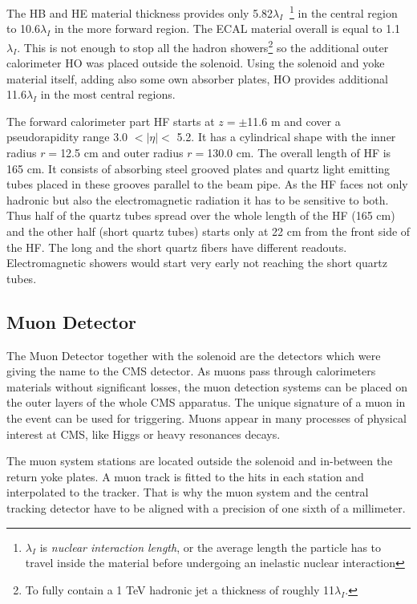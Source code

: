 The HB and HE material thickness provides only 5.82$\lambda_{I}\;\;$\footnote{$\lambda_{I}$ is \textit{nuclear interaction length}, or the average 
length the particle has to travel inside the material before undergoing an inelastic nuclear interaction} in the central region to 10.6$\lambda_{I}$ in the more forward
region. The ECAL material overall is equal to 1.1$\lambda_{I}$. This is not enough to stop all the hadron showers\footnote{To fully contain a 1 TeV hadronic jet a thickness of
roughly 11$\lambda_{I}$.} so the additional outer calorimeter HO
was placed outside the solenoid. Using the solenoid and yoke material itself, adding also some own absorber plates, HO provides additional 11.6$\lambda_{I}$ in the
most central regions.

The forward calorimeter part HF starts at $z = \pm$11.6 m and cover a pseudorapidity range  3.0 $ < |\eta| < $ 5.2. It has a cylindrical shape
with the inner radius $r = $12.5 cm and outer radius $r = $130.0 cm. The overall length of HF is 165 cm. It consists of absorbing steel grooved plates and
quartz light emitting tubes placed in these grooves parallel to the beam pipe. As the HF faces not only hadronic but also the electromagnetic radiation
it has to be sensitive to both. Thus half of the quartz tubes spread over the whole length of the HF (165 cm) and the other half (short quartz tubes) starts only at 22 cm 
from the front side of the HF. The long and the short quartz fibers have different readouts. Electromagnetic showers would start very early  not reaching the 
short quartz tubes.

\subsection{Muon Detector}\label{ssec:muonDet}

The Muon Detector\cite{CMSatLHC} together with the solenoid are the detectors which were giving the name to the CMS detector. As muons pass through calorimeters materials
without significant losses\cite{MuonStop}, the muon detection systems can be placed on the outer layers of the whole CMS apparatus.
The unique signature of a muon in the event can be used for triggering. Muons appear in many processes
of physical interest at CMS, like Higgs or heavy resonances decays.

The muon system stations are located outside the solenoid and in-between the return yoke plates. A muon track is fitted to the hits in each station 
and interpolated to the tracker. That is why the muon system and the central tracking detector have to be aligned with a precision of one sixth of a millimeter.

